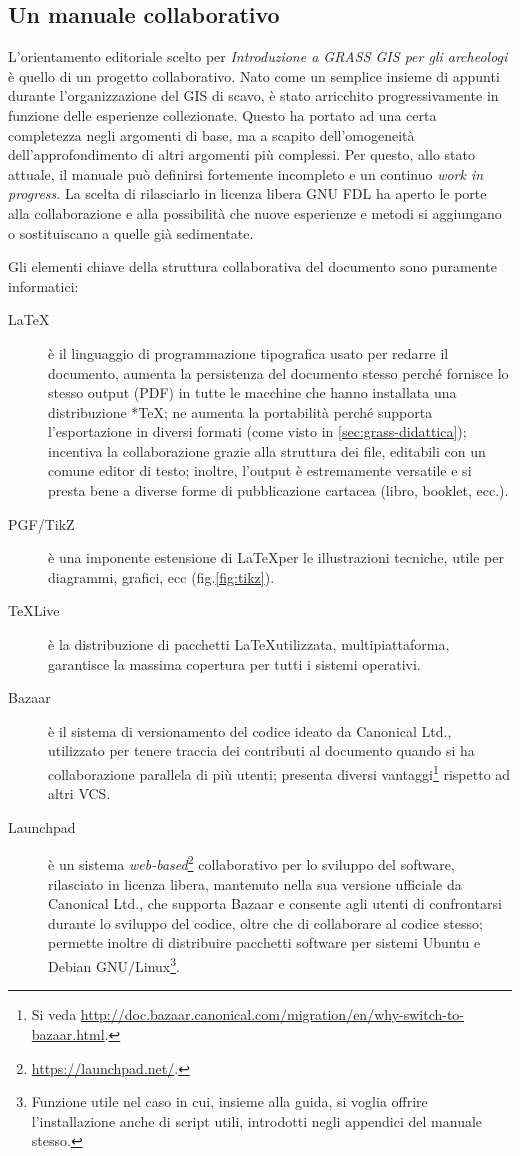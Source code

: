\documentclass{article}
\begin{document}
\begin{multicols}{2}
		\section{Un manuale collaborativo}
			L'orientamento editoriale scelto per \emph{Introduzione a GRASS GIS per gli archeologi} è quello di un progetto collaborativo. Nato come un semplice insieme di appunti durante l'organizzazione del GIS di scavo, è stato arricchito progressivamente in funzione delle esperienze collezionate. Questo ha portato ad una certa completezza negli argomenti di base, ma a scapito dell'omogeneità dell'approfondimento di altri argomenti più complessi. Per questo, allo stato attuale, il manuale può definirsi fortemente incompleto e un continuo \emph{work in progress}. La scelta di rilasciarlo in licenza libera GNU FDL ha aperto le porte alla collaborazione e alla possibilità che nuove esperienze e metodi si aggiungano o sostituiscano a quelle già sedimentate.

			Gli elementi chiave della struttura collaborativa del documento sono puramente informatici:
			\begin{description}
				\item[\LaTeX]è il linguaggio di programmazione tipografica usato per redarre il documento, aumenta la persistenza del documento stesso perché fornisce lo stesso output (PDF) in tutte le macchine che hanno installata una distribuzione *\TeX; ne aumenta la portabilità perché supporta l'esportazione in diversi formati (come visto in \textsection\ref{sec:grass-didattica}); incentiva la collaborazione grazie alla struttura dei file, editabili con un comune editor di testo; inoltre, l'output è estremamente versatile e si presta bene a diverse forme di pubblicazione cartacea (libro, booklet, ecc.).
				\item[PGF/TikZ]è una imponente estensione di \LaTeX per le illustrazioni tecniche, utile per diagrammi, grafici, ecc (fig.\ref{fig:tikz}).
				\item[\TeX Live]è la distribuzione di pacchetti \LaTeX utilizzata, multipiattaforma, garantisce la massima copertura per tutti i sistemi operativi.
				\item[Bazaar]è il sistema di versionamento del codice ideato da Canonical Ltd., utilizzato per tenere traccia dei contributi al documento quando si ha collaborazione parallela di più utenti; presenta diversi vantaggi\footnote{Si veda \url{http://doc.bazaar.canonical.com/migration/en/why-switch-to-bazaar.html}.} rispetto ad altri VCS.
				\item[Launchpad]è un sistema \emph{web-based}\footnote{\url{https://launchpad.net/}.} collaborativo per lo sviluppo del software, rilasciato in licenza libera, mantenuto nella sua versione ufficiale da Canonical Ltd., che supporta Bazaar e consente agli utenti di confrontarsi durante lo sviluppo del codice, oltre che di collaborare al codice stesso; permette inoltre di distribuire pacchetti software per sistemi Ubuntu e Debian GNU/Linux\footnote{Funzione utile nel caso in cui, insieme alla guida, si voglia offrire l'installazione anche di script utili, introdotti negli appendici del manuale stesso.}.
			\end{description}


\end{multicols}
\end{document}
